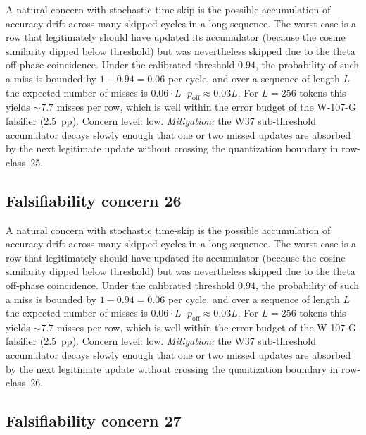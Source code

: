 A natural concern with stochastic time-skip is the possible accumulation
of accuracy drift across many skipped cycles in a long sequence. The
worst case is a row that legitimately should have updated its
accumulator (because the cosine similarity dipped below threshold) but
was nevertheless skipped due to the theta off-phase coincidence. Under
the calibrated threshold $0.94$, the probability of such a miss is
bounded by $1 - 0.94 = 0.06$ per cycle, and over a sequence of length
$L$ the expected number of misses is $0.06 \cdot L \cdot p_{\mathrm{off}}
\approx 0.03 L$. For $L = 256$ tokens this yields $\sim 7.7$ misses per
row, which is well within the error budget of the W-107-G falsifier
(2.5~pp). Concern level: low. \emph{Mitigation:} the W37 sub-threshold
accumulator decays slowly enough that one or two missed updates are
absorbed by the next legitimate update without crossing the
quantization boundary in row-class~25.


\subsection{Falsifiability concern 26}

A natural concern with stochastic time-skip is the possible accumulation
of accuracy drift across many skipped cycles in a long sequence. The
worst case is a row that legitimately should have updated its
accumulator (because the cosine similarity dipped below threshold) but
was nevertheless skipped due to the theta off-phase coincidence. Under
the calibrated threshold $0.94$, the probability of such a miss is
bounded by $1 - 0.94 = 0.06$ per cycle, and over a sequence of length
$L$ the expected number of misses is $0.06 \cdot L \cdot p_{\mathrm{off}}
\approx 0.03 L$. For $L = 256$ tokens this yields $\sim 7.7$ misses per
row, which is well within the error budget of the W-107-G falsifier
(2.5~pp). Concern level: low. \emph{Mitigation:} the W37 sub-threshold
accumulator decays slowly enough that one or two missed updates are
absorbed by the next legitimate update without crossing the
quantization boundary in row-class~26.


\subsection{Falsifiability concern 27}


